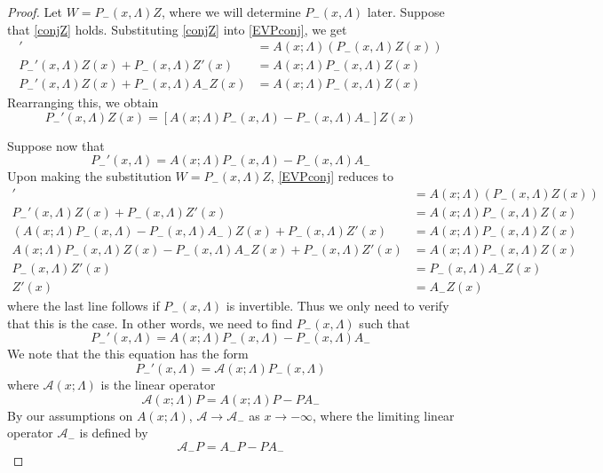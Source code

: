 \documentclass[thesis.tex]{subfiles}
\begin{document}
\begin{lemma}
\begin{proof}
Let $W = P_-(x, \Lambda) Z$, where we will determine $P_-(x, \Lambda)$ later. Suppose that \eqref{conjZ} holds. Substituting \eqref{conjZ} into \eqref{EVPconj}, we get
\begin{align*}
[P_-(x, \Lambda) Z(x)]' &= A(x; \Lambda)(P_-(x, \Lambda) Z(x)) \\
P_-'(x, \Lambda) Z(x) + P_-(x, \Lambda) Z'(x)
&= A(x; \Lambda)P_-(x, \Lambda) Z(x) \\
P_-'(x, \Lambda) Z(x) + P_-(x, \Lambda) A_- Z(x)
&= A(x; \Lambda)P_-(x, \Lambda) Z(x)
\end{align*}
Rearranging this, we obtain
\begin{equation}
P_-'(x, \Lambda) Z(x)
= [A(x; \Lambda)P_-(x, \Lambda) - P_-(x, \Lambda) A_-]Z(x)
\end{equation}

Suppose now that
\[
P_-'(x, \Lambda) = A(x; \Lambda)P_-(x, \Lambda) - P_-(x, \Lambda) A_-
\]
Upon making the substitution $W = P_-(x, \Lambda) Z$, \eqref{EVPconj} reduces to
\begin{align*}
[P_-(x, \Lambda) Z(x)]' &= A(x; \Lambda)(P_-(x, \Lambda) Z(x)) \\
P_-'(x, \Lambda) Z(x) + P_-(x, \Lambda) Z'(x)
&= A(x; \Lambda)P_-(x, \Lambda) Z(x) \\
(A(x; \Lambda)P_-(x, \Lambda) - P_-(x, \Lambda) A_-)Z(x) + P_-(x, \Lambda) Z'(x)
&= A(x; \Lambda)P_-(x, \Lambda) Z(x) \\
A(x; \Lambda)P_-(x, \Lambda)Z(x) - P_-(x, \Lambda) A_- Z(x) + P_-(x, \Lambda) Z'(x)
&= A(x; \Lambda)P_-(x, \Lambda) Z(x) \\
P_-(x, \Lambda) Z'(x) &= P_-(x, \Lambda) A_- Z(x) \\
Z'(x) &= A_- Z(x)
\end{align*}
where the last line follows if $P_-(x, \Lambda)$ is invertible. Thus we only need to verify that this is the case. In other words, we need to find $P_-(x, \Lambda)$ such that
\[
P_-'(x, \Lambda) = A(x; \Lambda)P_-(x, \Lambda) - P_-(x, \Lambda) A_-
\]
We note that the this equation has the form 
\begin{equation}\label{solvePminus}
P_-'(x, \Lambda) = \mathcal{A}(x; \Lambda) P_-(x, \Lambda)
\end{equation}
where $\mathcal{A}(x; \Lambda)$ is the linear operator
\[
\mathcal{A}(x; \Lambda) P = A(x; \Lambda) P - P A_-
\]
By our assumptions on $A(x; \Lambda)$, $\mathcal{A} \rightarrow \mathcal{A}_-$ as $x \rightarrow -\infty$, where the limiting linear operator $\mathcal{A}_-$ is defined by
\[
\mathcal{A}_- P = A_- P - P A_-
\]
\end{proof}
\end{lemma}
\end{document}
